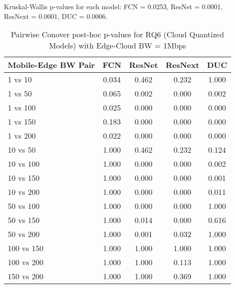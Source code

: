 \begin{table}[h]
\centering
\caption{Pairwise Conover post-hoc p-values for RQ6 (Cloud Quantized Models) with Edge-Cloud BW = 1Mbps}
\label{tab:conover_cloud_quantized_ec1}
\smallskip
Kruskal-Wallis p-values for each model: FCN = 0.0253, ResNet = 0.0001, ResNext = 0.0001, DUC = 0.0006.

\begin{tabular}{lcccc}
\toprule
Mobile-Edge BW Pair & FCN & ResNet & ResNext & DUC \\
\midrule
1 vs 10 & 0.034 & 0.462 & 0.232 & 1.000 \\
1 vs 50 & 0.065 & 0.002 & 0.000 & 0.002 \\
1 vs 100 & 0.025 & 0.000 & 0.000 & 0.000 \\
1 vs 150 & 0.183 & 0.000 & 0.000 & 0.000 \\
1 vs 200 & 0.022 & 0.000 & 0.000 & 0.000 \\
10 vs 50 & 1.000 & 0.462 & 0.232 & 0.124 \\
10 vs 100 & 1.000 & 0.000 & 0.000 & 0.002 \\
10 vs 150 & 1.000 & 0.000 & 0.000 & 0.001 \\
10 vs 200 & 1.000 & 0.000 & 0.000 & 0.011 \\
50 vs 100 & 1.000 & 0.000 & 0.000 & 1.000 \\
50 vs 150 & 1.000 & 0.014 & 0.000 & 0.616 \\
50 vs 200 & 1.000 & 0.001 & 0.032 & 1.000 \\
100 vs 150 & 1.000 & 1.000 & 1.000 & 1.000 \\
100 vs 200 & 1.000 & 1.000 & 0.113 & 1.000 \\
150 vs 200 & 1.000 & 1.000 & 0.369 & 1.000 \\
\bottomrule
\end{tabular}
\end{table}

